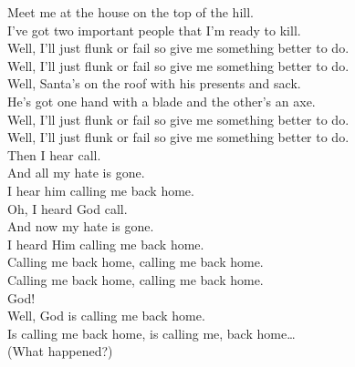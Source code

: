 



Meet me at the house on the top of the hill. \\
I've got two important people that I'm ready to kill. \\

Well, I'll just flunk or fail so give me something better to do. \\
Well, I'll just flunk or fail so give me something better to do. \\

Well, Santa's on the roof with his presents and sack. \\
He's got one hand with a blade and the other's an axe. \\

Well, I'll just flunk or fail so give me something better to do. \\
Well, I'll just flunk or fail so give me something better to do. \\

Then I hear  call. \\
And all my hate is gone. \\
I hear him calling me back home. \\

Oh, I heard God call. \\
And now my hate is gone. \\
I heard Him calling me back home. \\

Calling me back home, calling me back home. \\
Calling me back home, calling me back home. \\

God! \\

Well, God is calling me back home. \\
Is calling me back home, is calling me, back home… \\

(What happened?) \\




